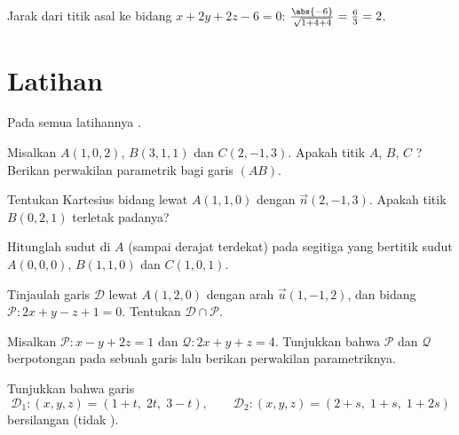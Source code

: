 \begin{example}\label{ex:g12:space:distance}
Jarak dari titik asal ke bidang $x + 2y + 2z - 6 = 0$:
$\frac{\abs{-6}}{\sqrt{1 + 4 + 4}} = \frac63 = 2$.
\end{example}

\section{Latihan}

Pada semua latihannya  .

\begin{exercise}[$\star$]\label{exo:g12:space:1}
Misalkan $A(1, 0, 2)$, $B(3, 1, 1)$ dan $C(2, -1, 3)$. Apakah titik $A$, $B$,
$C$ ? Berikan perwakilan parametrik bagi garis $(AB)$.
\end{exercise}

\begin{exercise}[$\star$]\label{exo:g12:space:2}
Tentukan  Kartesius bidang lewat $A(1, 1, 0)$ dengan
 $\vec n(2, -1, 3)$. Apakah titik $B(0, 2, 1)$ terletak padanya?
\end{exercise}

\begin{exercise}[$\star$]\label{exo:g12:space:3}
Hitunglah sudut di $A$ (sampai derajat terdekat) pada segitiga yang bertitik
sudut $A(0,0,0)$, $B(1, 1, 0)$ dan $C(1, 0, 1)$.
\end{exercise}

\begin{exercise}[$\star\star$]\label{exo:g12:space:4}
Tinjaulah garis $\mathcal D$ lewat $A(1, 2, 0)$ dengan arah
$\vec u(1, -1, 2)$, dan bidang $\mathcal P : 2x + y - z + 1 = 0$.
Tentukan $\mathcal D \cap \mathcal P$.
\end{exercise}

\begin{exercise}[$\star\star$]\label{exo:g12:space:5}
Misalkan $\mathcal P : x - y + 2z = 1$ dan $\mathcal Q : 2x + y + z = 4$.
Tunjukkan bahwa $\mathcal P$ dan $\mathcal Q$ berpotongan pada sebuah garis lalu
berikan perwakilan parametriknya.
\end{exercise}

\begin{exercise}[$\star\star$]\label{exo:g12:space:6}
Tunjukkan bahwa garis
\[
\mathcal D_1 : (x, y, z) = (1 + t,\; 2t,\; 3 - t), \qquad
\mathcal D_2 : (x, y, z) = (2 + s,\; 1 + s,\; 1 + 2s)
\]
bersilangan (tidak ).
\end{exercise}

